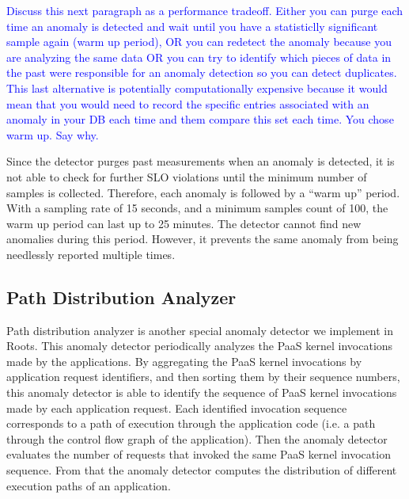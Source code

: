 \textcolor{blue}{Discuss this next paragraph as a performance tradeoff.  
Either you can purge each time an anomaly is detected and wait until you have
a statisticlly significant sample again (warm up period), OR you can redetect
the anomaly because you are analyzing the same data OR you can try to identify
which pieces of data in the past were responsible for an anomaly detection so
you can detect duplicates.  This last alternative is potentially
computationally expensive because it would mean that you would need to record
the specific entries associated with an anomaly in your DB each time and them
compare this set each time.  You chose warm up.  Say why.}
 
Since the detector purges past measurements when an anomaly is detected, it is not able to
check for further SLO violations until the minimum number of samples is collected. Therefore,
each anomaly is followed by a ``warm up'' period. With a sampling rate of 15 seconds, and a minimum
samples count of 100, the warm up period can last up to 25 minutes. The detector cannot find new
anomalies during this period. However, it prevents the same anomaly from being needlessly
reported multiple times.

\subsection{Path Distribution Analyzer}



Path distribution analyzer is another special anomaly detector we implement in Roots. This
anomaly detector periodically analyzes the PaaS kernel invocations made by the applications.
By aggregating the PaaS kernel invocations by application request identifiers, and then sorting them by
their sequence numbers, this anomaly detector is able to identify the sequence of
PaaS kernel invocations made by each application request. 
Each identified invocation sequence corresponds to a path of
execution through the application code (i.e. a path through the control flow graph of the application). 
Then the anomaly detector evaluates the number of requests
that invoked the same PaaS kernel invocation sequence. From that the anomaly detector
computes the distribution of different execution paths of an application.

